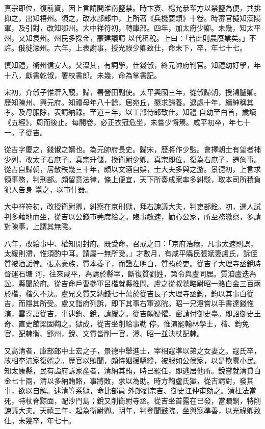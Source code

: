 \begin{pinyinscope}
 真宗即位，復前資，因上言請開淮南鹽禁。時卞袞、楊允恭輩方以禁鹽為便，共排抑之，出知梧州。頃之，改水部郎中，上所著《兵機要類》十卷。時審官擬知漢陽軍，及引對，改知鄂州。大中祥符初，轉庫部。四年，加太府少卿。未幾，知太平州，又知袁州。州民多採金，蒙建議請
 以代租稅。上曰：「若此則農廢業矣。」不許。俄徙濠州。六年，上表謝事，授光祿少卿致仕，命未下，卒，年七十七。



 慎知禮，衢州信安人。父溫其，有詞學，仕錢俶，終元帥府判官。知禮幼好學，年十八，獻書乾俶，署校書郎。未幾，命為掌書記。



 宋初，介俶子惟濟入覲，歸，署營田副使。太平興國三年，從俶歸朝，授鴻臚卿。歷知陳州、興元府。知禮母年八十餘，居宛丘，懇求歸養。退處十年，縉紳稱其孝。及母服除，表請納祿。至道三年，以工部侍郎致仕。知禮
 自幼至白首，歲讀《五經》，周而後止。每開卷，必正衣冠危坐，未嘗少懈焉。咸平初卒，年七十一。子從吉。



 從吉字慶之，錢俶之婿也。為元帥府長史。歸宋，歷將作少監。會擇朝士有望者補少列，改太子右庶子。真宗升儲，換衛尉少卿。真宗即位，復為右庶子，遷詹事。從吉自歸朝，居散秩幾三十年，頗以文酒自娛，士大夫多與之游。景德初，上言求領事務，判刑部。頗留意法律，條上便宜，天下所奏成案率多糾駁，取本司所積負犯人告身
 鬻之，以市什器。



 大中祥符初，改授衛尉卿，糾察在京刑獄，拜右諫議大夫，判吏部銓。初，選人試判多藉地而坐，從吉以公錢市莞席給之。臨事敏速，勤心公家，所至務皦察，多請對陳事，上謂其無隱。



 八年，改給事中、權知開封府。既受命，召戒之曰：「京府浩穰，凡事太速則誤，太緩則滯，惟須酌中耳。請屬一無所受。」才數月，有咸平縣民張斌妻盧氏，訴侄質被酒詬悖。張素豪族，質本養子，而證左明白，質賄於吏。從吉子大理寺丞銳時督運石塘
 河，往來咸平，為請於縣宰，斷復質劉姓，第令與盧同居。質洎盧迭為訟，縣聞於府。從吉命戶曹參軍呂楷就縣推問。盧之從叔虢略尉昭一賂白金三百兩於楷，楷久不決。盧兄文質又納錢七十萬於從吉長子大理寺丞鈞，鈞以其事白從吉，而隱其所受。盧又詣府列訴，即下其事右軍巡院。昭一兄澄嘗以手書達錢惟演，雲寄語從吉，事逮鈞、銳，請緩之。從吉頗疑懼，密請付御史臺。即詔御史王奇、直史館梁固鞫之。獄成，從吉坐削給事勒
 停，惟演罷翰林學士，楷、鈞免官，配隸衡、郢州，銳、文質皆削一官，澄、昭一並決杖配隸。



 又高清者，庫部郎中士宏之子，景德中舉進士，宰相寇準以弟之女妻之。寇氏卒，故相李沆家復婿之。歷官以賄聞，頗恃姻援驕縱，被服如公侯家，以是欺蠹小民。知太康縣，民有詣府訴家產者，清納其賄，時已罷任，即逃居他所。銳嘗就清貸白金七十兩，清以多納賄賂，事將敗，求以為助。時方鞫盧氏獄，從吉請對，發其事，欲以自解。逮清等系獄，命比部員
 外郎劉宗吉、御史江仲甫劾之。清枉法當死，特杖脊黥面，配沙門島；銳又削衛尉寺丞。從吉坐首露在已發，當贖銅，特削諫議大夫。天禧三年，起為衛尉卿。明年，判登聞鼓院。坐與寇準善，以光祿卿致仕。未幾卒，年七十。




\end{pinyinscope}
